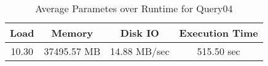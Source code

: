 \documentclass[../../main.tex]{subfiles}
\begin{document}
    \begin{table}
        \begin{center}
            \begin{tabular}{ |c|c|c|c| } 
            \hline
            Load & Memory & Disk IO & Execution Time\\
            \hline
            10.30 & 37495.57 MB & 14.88 MB/sec & 515.50 sec \\
            \hline
            \end{tabular}
            \\[1pt]
            \caption{Average Parametes over Runtime for Query04}
        \end{center}
    \end{table}
    \pagebreak
\end{document}
